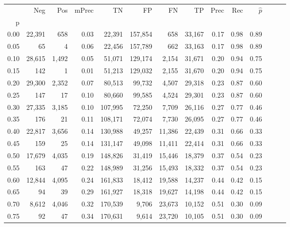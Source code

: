 \begin{tabular}{rrrrrrrrrrrrrr}
\toprule
{} &     Neg &    Pos & mPrec &       TN &       FP &      FN &      TP &  Prec &   Rec & $\hat{p}$ \\
p    &         &        &       &          &          &         &         &       &       &           \\
\midrule
0.00 &  22,391 &    658 &  0.03 &   22,391 &  157,854 &     658 &  33,167 &  0.17 &  0.98 &      0.89 \\
0.05 &      65 &      4 &  0.06 &   22,456 &  157,789 &     662 &  33,163 &  0.17 &  0.98 &      0.89 \\
0.10 &  28,615 &  1,492 &  0.05 &   51,071 &  129,174 &   2,154 &  31,671 &  0.20 &  0.94 &      0.75 \\
0.15 &     142 &      1 &  0.01 &   51,213 &  129,032 &   2,155 &  31,670 &  0.20 &  0.94 &      0.75 \\
0.20 &  29,300 &  2,352 &  0.07 &   80,513 &   99,732 &   4,507 &  29,318 &  0.23 &  0.87 &      0.60 \\
0.25 &     147 &     17 &  0.10 &   80,660 &   99,585 &   4,524 &  29,301 &  0.23 &  0.87 &      0.60 \\
0.30 &  27,335 &  3,185 &  0.10 &  107,995 &   72,250 &   7,709 &  26,116 &  0.27 &  0.77 &      0.46 \\
0.35 &     176 &     21 &  0.11 &  108,171 &   72,074 &   7,730 &  26,095 &  0.27 &  0.77 &      0.46 \\
0.40 &  22,817 &  3,656 &  0.14 &  130,988 &   49,257 &  11,386 &  22,439 &  0.31 &  0.66 &      0.33 \\
0.45 &     159 &     25 &  0.14 &  131,147 &   49,098 &  11,411 &  22,414 &  0.31 &  0.66 &      0.33 \\
0.50 &  17,679 &  4,035 &  0.19 &  148,826 &   31,419 &  15,446 &  18,379 &  0.37 &  0.54 &      0.23 \\
0.55 &     163 &     47 &  0.22 &  148,989 &   31,256 &  15,493 &  18,332 &  0.37 &  0.54 &      0.23 \\
0.60 &  12,844 &  4,095 &  0.24 &  161,833 &   18,412 &  19,588 &  14,237 &  0.44 &  0.42 &      0.15 \\
0.65 &      94 &     39 &  0.29 &  161,927 &   18,318 &  19,627 &  14,198 &  0.44 &  0.42 &      0.15 \\
0.70 &   8,612 &  4,046 &  0.32 &  170,539 &    9,706 &  23,673 &  10,152 &  0.51 &  0.30 &      0.09 \\
0.75 &      92 &     47 &  0.34 &  170,631 &    9,614 &  23,720 &  10,105 &  0.51 &  0.30 &      0.09 \\

\end{tabular}
